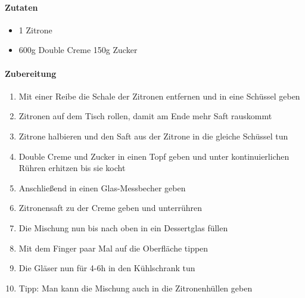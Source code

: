 \newpage
{}

\paragraph{Zutaten}
\begin{itemize}
	\item 1 Zitrone
	\item 600g Double Creme
	\Item 150g Zucker
\end{itemize}


\paragraph{Zubereitung}
\begin{enumerate}[noitemsep]
	\item Mit einer Reibe die Schale der Zitronen entfernen und in eine Schüssel geben
	\item Zitronen auf dem Tisch rollen, damit am Ende mehr Saft rauskommt
	\item Zitrone halbieren und den Saft aus der Zitrone in die gleiche Schüssel tun
	\item Double Creme und Zucker in einen Topf geben und unter kontinuierlichen Rühren erhitzen bis sie kocht 
	\item Anschließend in einen Glas-Messbecher geben
	\item Zitronensaft zu der Creme geben und unterrühren
	\item Die Mischung nun bis nach oben in ein Dessertglas füllen
	\item Mit dem Finger paar Mal auf die Oberfläche tippen
	\item Die Gläser nun für 4-6h in den Kühlschrank tun
	\item Tipp: Man kann die Mischung auch in die Zitronenhüllen geben
\end{enumerate}